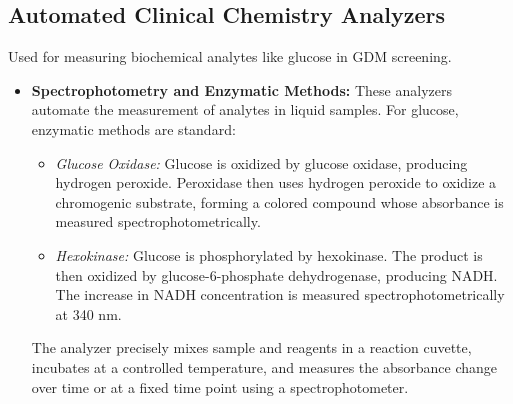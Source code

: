 \documentclass{article}
\begin{document}
\subsection{Automated Clinical Chemistry Analyzers}
Used for measuring biochemical analytes like glucose in GDM screening.
\begin{itemize}
    \item \textbf{Spectrophotometry and Enzymatic Methods:} These analyzers automate the measurement of analytes in liquid samples. For glucose, enzymatic methods are standard:
    \begin{itemize}
        \item \textit{Glucose Oxidase:} Glucose is oxidized by glucose oxidase, producing hydrogen peroxide. Peroxidase then uses hydrogen peroxide to oxidize a chromogenic substrate, forming a colored compound whose absorbance is measured spectrophotometrically.
        \item \textit{Hexokinase:} Glucose is phosphorylated by hexokinase. The product is then oxidized by glucose-6-phosphate dehydrogenase, producing NADH. The increase in NADH concentration is measured spectrophotometrically at 340 nm.
    \end{itemize}
    The analyzer precisely mixes sample and reagents in a reaction cuvette, incubates at a controlled temperature, and measures the absorbance change over time or at a fixed time point using a spectrophotometer.

\end{itemize}
\end{document}
